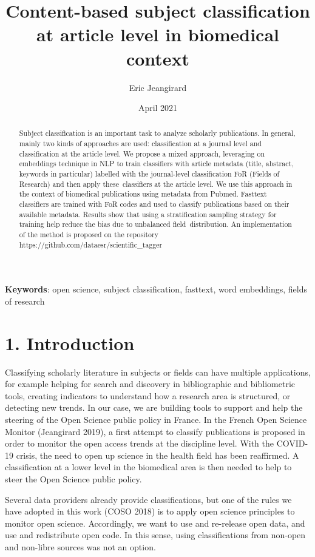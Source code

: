 \documentclass[
]{article}
\title{Content-based subject classification at article level in
biomedical context}
\author[%
  1%
  ]{%
  Eric Jeangirard%
}
\affil[1]{French Ministry of Higher Education, Research and Innovation,
Paris, France}
\date{April 2021}
\begin{document}
\maketitle
\begin{abstract}
Subject classification is an important task to analyze scholarly
publications. In general, mainly two kinds of approaches are used:
classification at a journal level and classification at the article
level. We propose a mixed approach, leveraging on embeddings technique
in NLP to train classifiers with article metadata (title, abstract,
keywords in particular) labelled with the journal-level classification
FoR (Fields of Research) and then apply these~classifiers at the article
level. We use this approach in the context of biomedical publications
using metadata from Pubmed. Fasttext classifiers are trained with FoR
codes and used to classify publications based on their available
metadata. Results show that using a stratification sampling strategy for
training help reduce the bias due to unbalanced field~distribution. An
implementation of the method is proposed on the repository
https://github.com/dataesr/scientific\_tagger
\end{abstract}

\textbf{Keywords}: open science, subject classification, fasttext, word
embeddings, fields of research

\hypertarget{introduction}{%
\section{1. Introduction}\label{introduction}}

Classifying scholarly literature in subjects or fields can have multiple
applications, for example helping for search and discovery in
bibliographic and bibliometric tools, creating indicators to understand
how a research area is structured, or detecting new trends. In our case,
we are building tools to support and help the steering of the Open
Science public policy in France. In the French Open Science Monitor
(Jeangirard 2019), a first attempt to classify publications is proposed
in order to monitor the open access trends at the discipline level. With
the COVID-19 crisis, the need to open up science in the health field has
been reaffirmed. A classification at a lower level in the biomedical
area is then needed to help to steer the Open Science public policy.

Several data providers already provide classifications, but one of the
rules we have adopted in this work (COSO 2018) is to apply open science
principles to monitor open science. Accordingly, we want to use and
re-release open data, and use and redistribute open code. In this sense,
using classifications from non-open and non-libre sources was not an
option.
\end{document}
